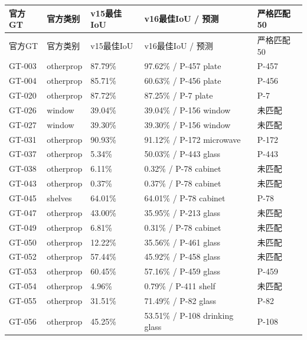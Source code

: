 \documentclass[UTF8,fontset=fandol]{ctexart}
\begin{document}
{\small
\begin{longtable}{|p{}|p{}|p{}|p{}|p{}|}
\hline
官方GT & 官方类别 & v15最佳IoU & v16最佳IoU / 预测 & 严格匹配50 \\ \hline
\endfirsthead
\hline
官方GT & 官方类别 & v15最佳IoU & v16最佳IoU / 预测 & 严格匹配50 \\ \hline
\endhead
GT-003 & otherprop & 87.79\% & 97.62\% / P-457 plate & P-457 \\ \hline
GT-004 & otherprop & 85.71\% & 60.63\% / P-456 plate & P-456 \\ \hline
GT-020 & otherprop & 87.72\% & 87.25\% / P-7 plate & P-7 \\ \hline
GT-026 & window & 39.04\% & 39.04\% / P-156 window & 未匹配 \\ \hline
GT-027 & window & 39.30\% & 39.30\% / P-156 window & 未匹配 \\ \hline
GT-031 & otherprop & 90.93\% & 91.12\% / P-172 microwave & P-172 \\ \hline
GT-037 & otherprop & 5.34\% & 50.03\% / P-443 glass & P-443 \\ \hline
GT-038 & otherprop & 6.11\% & 0.32\% / P-78 cabinet & 未匹配 \\ \hline
GT-043 & otherprop & 0.37\% & 0.37\% / P-78 cabinet & 未匹配 \\ \hline
GT-045 & shelves & 64.01\% & 64.01\% / P-78 cabinet & P-78 \\ \hline
GT-047 & otherprop & 43.00\% & 35.95\% / P-213 glass & 未匹配 \\ \hline
GT-049 & otherprop & 6.81\% & 0.31\% / P-78 cabinet & 未匹配 \\ \hline
GT-050 & otherprop & 12.22\% & 35.56\% / P-461 glass & 未匹配 \\ \hline
GT-052 & otherprop & 57.44\% & 45.92\% / P-458 glass & 未匹配 \\ \hline
GT-053 & otherprop & 60.45\% & 57.16\% / P-459 glass & P-459 \\ \hline
GT-054 & otherprop & 4.96\% & 0.79\% / P-411 shelf & 未匹配 \\ \hline
GT-055 & otherprop & 31.51\% & 71.49\% / P-82 glass & P-82 \\ \hline
GT-056 & otherprop & 45.25\% & 53.51\% / P-108 drinking glass & P-108 \\ \hline

\end{longtable}}
\end{document}
